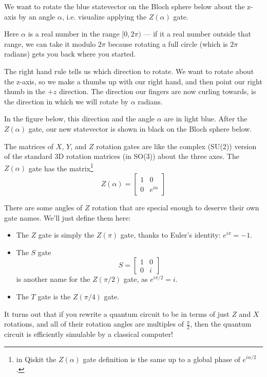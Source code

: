 \documentclass{article}
\theoremstyle{definition}
\begin{document}
\newpage
\begin{example}
We want to rotate the blue statevector on the Bloch sphere below about the z-axis by an angle $\alpha$, i.e. visualize applying the $Z(\alpha)$ gate.

\textnormal{Here $\alpha$ is a real number in the range $[0,2\pi)$ --- if it a real number outside that range, we can take it modulo $2\pi$ because rotating a full circle (which is $2\pi$ radians) gets you back where you started.}

\textnormal{The right hand rule tells us which direction to rotate.  We want to rotate about the z-axis, so we make a thumbs up with our right hand, and then point our right thumb in the $+z$ direction.  The direction our fingers are now curling towards, is the direction in which we will rotate by $\alpha$ radians.}

\textnormal{In the figure below, this direction and the angle $\alpha$ are in light blue.  After the $Z(\alpha)$ gate, our new statevector is shown in black on the Bloch sphere below.}
\begin{figure}[H]
\end{figure}
\end{example}

The matrices of $X$, $Y$, and $Z$ rotation gates are like the complex (SU(2)) version of the standard 3D rotation matrices (in SO(3)) about the three axes.
The $Z(\alpha)$ gate has the matrix\footnote{in Qiskit the $Z(\alpha)$ gate definition is the same up to a global phase of $e^{i\alpha/2}$.}
\begin{equation}
	Z(\alpha) = \begin{bmatrix}
		1 & 0\\
		0 & e^{i\alpha}
	\end{bmatrix}
\end{equation}

There are some angles of $Z$ rotation that are special enough to deserve their own gate names.
We'll just define them here:
\begin{itemize}
	\item The $Z$ gate is simply the $Z(\pi)$ gate, thanks to Euler's identity: $e^{i\pi} = -1$.
	\item The $S$ gate \begin{equation}
		S = \begin{bmatrix}
			1 & 0\\
			0 & i
		\end{bmatrix}
	\end{equation} is another name for the $Z(\pi/2)$ gate, as $e^{i\pi/2} = i$.
	\item The $T$ gate is the $Z(\pi/4)$ gate.
\end{itemize}
It turns out that if you rewrite a quantum circuit to be in terms of just $Z$ and $X$ rotations, and all of their rotation angles are multiples of $\frac{\pi}{2}$, then the quantum circuit is efficiently simulable by a classical computer!
\end{document}
